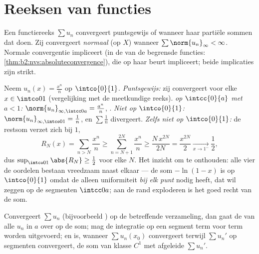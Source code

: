 \section{Reeksen van functies}

\begin{definition}\label{def:b2:funcseq:series}
Een functiereeks $\sum u_n$ convergeert puntsgewijs of 
wanneer haar partiële sommen dat doen. Zij convergeert
\emph{normaal} (op $X$) wanneer $\sum
\norm{u_n}_\infty < \infty$. Normale convergentie impliceert
 (in de  van de begrensde
functies: \cref{thm:b2:nvs:absoluteconvergence}), die op haar beurt
 impliceert; beide implicaties zijn
strikt.
\end{definition}

\begin{example}\label{ex:b2:funcseq:threemodes}
Neem $u_n(x) = \frac{x^n}{n}$ op $\intco{0}{1}$.
\emph{Puntsgewijs:} zij convergeert voor elke $x \in \intco01$
(vergelijking met de meetkundige reeks). \emph{ op
$\intcc{0}{a}$ met $a < 1$:} $\norm{u_n}_{\infty,\intcc0a} =
\frac{a^n}{n}$, . \emph{Niet  op
$\intco{0}{1}$:} $\norm{u_n}_{\infty,\intco01} = \frac1n$, en
$\sum\frac1n$ divergeert. \emph{Zelfs niet  op
$\intco{0}{1}$:} de restsom verzet zich bij $1$,
\[
R_N(x) = \sum_{n>N}\frac{x^n}{n}
\geq \sum_{n=N+1}^{2N}\frac{x^n}{n}
\geq \frac{N\,x^{2N}}{2N} = \frac{x^{2N}}{2}
\xrightarrow[x\to1^-]{} \frac12 ,
\]
dus $\sup_{\intco01}\abs{R_N} \geq \frac12$ voor elke $N$. Het
inzicht om te onthouden: alle vier de oordelen bestaan vreedzaam
naast elkaar --- de som $-\ln(1-x)$ is  op $\intco{0}{1}$
omdat de  alleen uniformiteit \emph{bij elk punt}
nodig heeft, dat wil zeggen op de segmenten $\intcc0a$; aan de rand
exploderen is het goed recht van de som.
\end{example}

\begin{theorem}\label{thm:b2:funcseq:seriestransfer}
Convergeert $\sum u_n$  (bijvoorbeeld ) op de
betreffende verzameling, dan gaat de  van alle $u_n$ in
$a$ over op de som; mag de integratie op een segment term voor term
worden uitgevoerd; en is, wanneer $\sum u_n(x_0)$ convergeert
terwijl $\sum u_n'$  op segmenten convergeert, de som van
klasse $C^1$ met afgeleide $\sum u_n'$.
\end{theorem}

